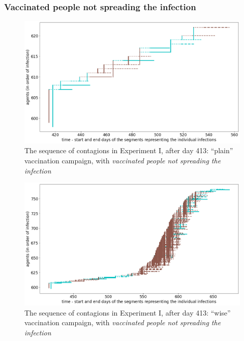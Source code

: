 \documentclass[graybox]{svmult}
\begin{document}
\subsubsection{Vaccinated people not spreading the infection}

\begin{figure}[t]
\center
\includegraphics[scale=0.3]{ExperimentForGA_I_0>413.png}

\caption{The sequence of contagions in Experiment I, after day 413: ``plain'' vaccination campaign, with \emph{vaccinated people not spreading the infection}} 
\label{ExperimentForGA_I_0>413}
\end{figure}

\begin{figure}[t]
\center
\includegraphics[scale=0.3]{ExperimentForGA_I_2_0>413.png}

\caption{The sequence of contagions in Experiment I, after day 413: ``wise'' vaccination campaign, with \emph{vaccinated people not spreading the infection}} 
\label{ExperimentForGA_I_2_0>413}
\end{figure}
\end{document}
